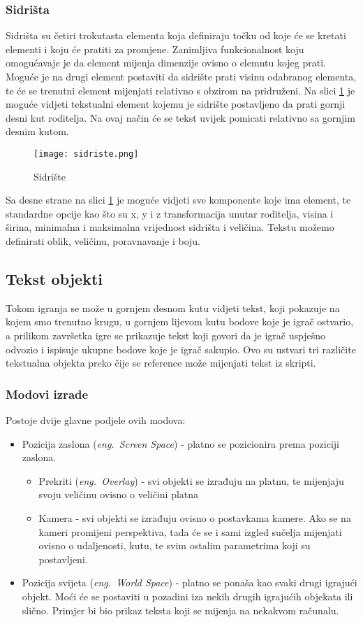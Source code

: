 \subsubsection{Sidrišta}
Sidrišta su četiri trokutasta elementa koja definiraju točku od koje će se kretati elementi i koju će pratiti za promjene. Zanimljiva funkcionalnost koju omogućavaje je da element mijenja dimenzije ovisno o elemntu kojeg prati. Moguće je na drugi element postaviti da sidrište prati visinu odabranog elementa, te će se trenutni element mijenjati relativno s obzirom na pridruženi. Na slici \ref{fig:sidriste} je moguće vidjeti tekstualni element kojemu je sidrište postavljeno da prati gornji desni kut roditelja. Na ovaj način će se tekst uvijek pomicati relativno sa gornjim desnim kutom.
\begin{figure}[h]
	\texttt{[image: sidriste.png]}
	\centering
	\caption{Sidrište}
	\label{fig:sidriste}
\end{figure}
\newline
Sa desne strane na slici \ref{fig:sidriste} je moguće vidjeti sve komponente koje ima element, te standardne opcije kao što su x, y i z transformacija unutar roditelja, visina i širina, minimalna i maksimalna vrijednost sidrišta i veličina. Tekstu možemo definirati oblik, veličinu, poravnavanje i boju.

\subsection{Tekst objekti}
Tokom igranja se može u gornjem desnom kutu vidjeti tekst, koji pokazuje na kojem smo trenutno krugu, u gornjem lijevom kutu bodove koje je igrač ostvario, a prilikom završetka igre se prikazuje tekst koji govori da je igrač uspješno odvozio i ispisuje ukupne bodove koje je igrač sakupio. Ovo su ustvari tri različite tekstualna objekta preko čije se reference može mijenjati tekst iz skripti. 

\subsubsection{Modovi izrade}
Postoje dvije glavne podjele ovih modova:
\begin{itemize} 
	\item Pozicija zaslona (\emph{eng.~Screen Space}) - platno se pozicionira prema poziciji zaslona. 
		\begin{itemize}
			\item Prekriti (\emph{eng.~Overlay}) - svi objekti se izrađuju na platnu, te mijenjaju svoju veličinu ovisno o veličini platna
			\item Kamera - svi objekti se izrađuju ovisno o postavkama kamere. Ako se na kameri promijeni perspektiva, tada će se i sami izgled sučelja mijenjati ovisno o udaljenosti, kutu, te svim ostalim parametrima koji su postavljeni.
		\end{itemize}
	\item Pozicija svijeta (\emph{eng.~World Space}) - platno se ponaša kao svaki drugi igrajući objekt. Moći će se postaviti u pozadini iza nekih drugih igrajućih objekata ili slično. Primjer bi bio prikaz teksta koji se mijenja na nekakvom računalu.
\end{itemize}

